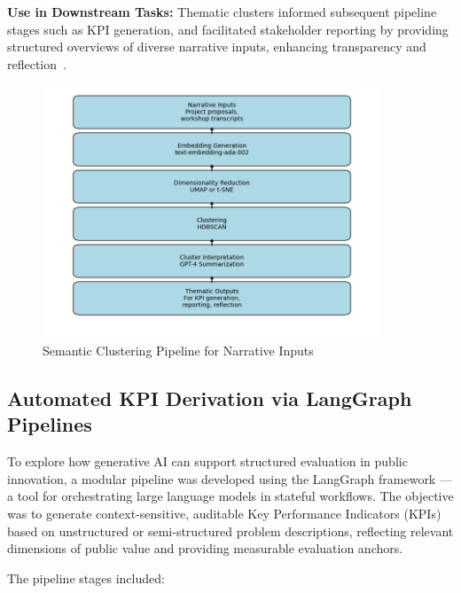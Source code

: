 \textbf{Use in Downstream Tasks:} Thematic clusters informed subsequent pipeline stages such as KPI generation, and facilitated stakeholder reporting by providing structured overviews of diverse narrative inputs, enhancing transparency and reflection~\citep{Braun2019ThematicAnalysis,Feng2019MixedMethodsNLP}.


\begin{figure}[H]
    \centering
    \includegraphics[width=0.9\textwidth]{../fig/clustering_pipeline}
    \caption{Semantic Clustering Pipeline for Narrative Inputs}
    \label{fig:clustering-pipeline}
\end{figure}


\subsection{Automated KPI Derivation via LangGraph Pipelines}\label{subsec:kpi-pipeline}

To explore how generative AI can support structured evaluation in public innovation, a modular pipeline was developed using the LangGraph framework — a tool for orchestrating large language models in stateful workflows.
The objective was to generate context-sensitive, auditable Key Performance Indicators (KPIs) based on unstructured or semi-structured problem descriptions, reflecting relevant dimensions of public value and providing measurable evaluation anchors.

The pipeline stages included:

